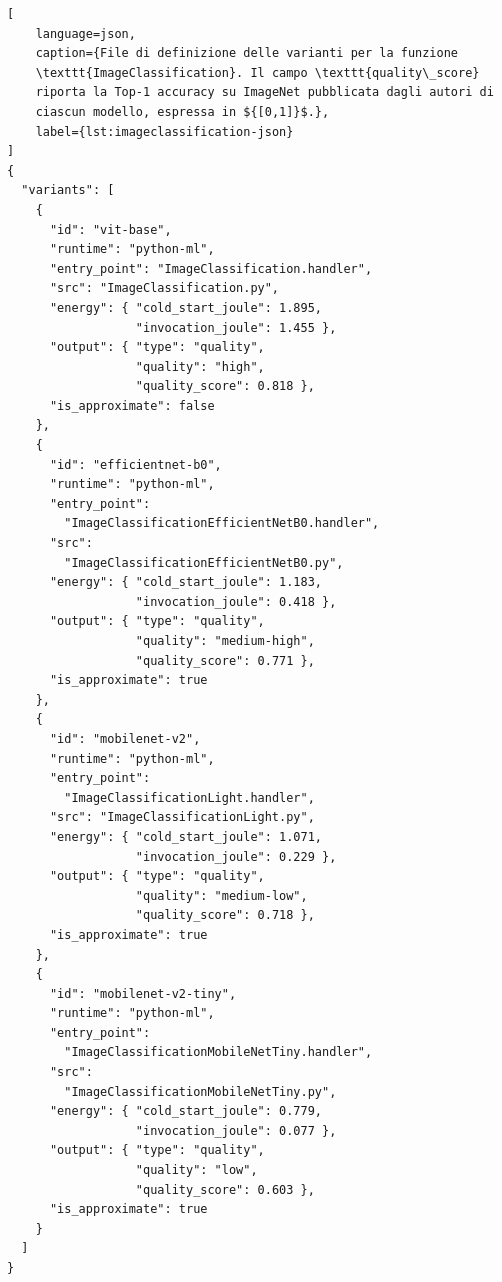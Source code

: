 \begin{lstlisting}[
    language=json,
    caption={File di definizione delle varianti per la funzione
    \texttt{ImageClassification}. Il campo \texttt{quality\_score}
    riporta la Top-1 accuracy su ImageNet pubblicata dagli autori di
    ciascun modello, espressa in ${[0,1]}$.},
    label={lst:imageclassification-json}
]
{
  "variants": [
    {
      "id": "vit-base",
      "runtime": "python-ml",
      "entry_point": "ImageClassification.handler",
      "src": "ImageClassification.py",
      "energy": { "cold_start_joule": 1.895,
                  "invocation_joule": 1.455 },
      "output": { "type": "quality",
                  "quality": "high",
                  "quality_score": 0.818 },
      "is_approximate": false
    },
    {
      "id": "efficientnet-b0",
      "runtime": "python-ml",
      "entry_point":
        "ImageClassificationEfficientNetB0.handler",
      "src":
        "ImageClassificationEfficientNetB0.py",
      "energy": { "cold_start_joule": 1.183,
                  "invocation_joule": 0.418 },
      "output": { "type": "quality",
                  "quality": "medium-high",
                  "quality_score": 0.771 },
      "is_approximate": true
    },
    {
      "id": "mobilenet-v2",
      "runtime": "python-ml",
      "entry_point":
        "ImageClassificationLight.handler",
      "src": "ImageClassificationLight.py",
      "energy": { "cold_start_joule": 1.071,
                  "invocation_joule": 0.229 },
      "output": { "type": "quality",
                  "quality": "medium-low",
                  "quality_score": 0.718 },
      "is_approximate": true
    },
    {
      "id": "mobilenet-v2-tiny",
      "runtime": "python-ml",
      "entry_point":
        "ImageClassificationMobileNetTiny.handler",
      "src":
        "ImageClassificationMobileNetTiny.py",
      "energy": { "cold_start_joule": 0.779,
                  "invocation_joule": 0.077 },
      "output": { "type": "quality",
                  "quality": "low",
                  "quality_score": 0.603 },
      "is_approximate": true
    }
  ]
}
\end{lstlisting}

